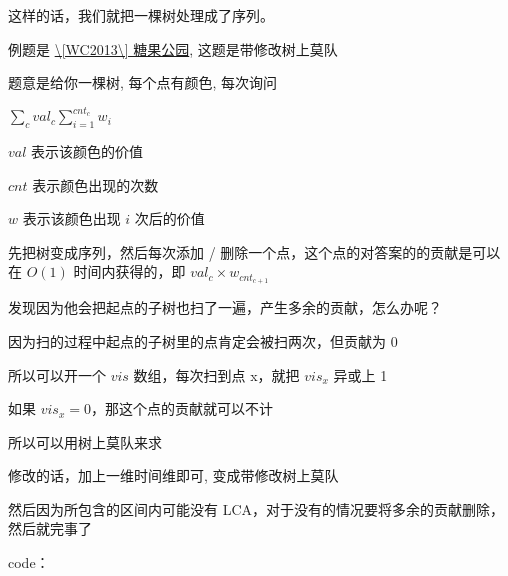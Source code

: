 这样的话，我们就把一棵树处理成了序列。

例题是 \href{https://www.luogu.org/problemnew/show/P4074}{\textbackslash{}[WC2013\textbackslash{}] 糖果公园}, 这题是带修改树上莫队

题意是给你一棵树, 每个点有颜色, 每次询问

$\sum_{c}val_c\sum_{i=1}^{cnt_c}w_i$

$val$ 表示该颜色的价值

$cnt$ 表示颜色出现的次数

$w$ 表示该颜色出现 $i$ 次后的价值

先把树变成序列，然后每次添加 / 删除一个点，这个点的对答案的的贡献是可以在 $O(1)$ 时间内获得的，即 $val_c\times w_{cnt_{c+1}}$

发现因为他会把起点的子树也扫了一遍，产生多余的贡献，怎么办呢？

因为扫的过程中起点的子树里的点肯定会被扫两次，但贡献为 0

所以可以开一个 $vis$ 数组，每次扫到点 x，就把 $vis_x$ 异或上 1

如果 $vis_x=0$，那这个点的贡献就可以不计

所以可以用树上莫队来求

修改的话，加上一维时间维即可, 变成带修改树上莫队

然后因为所包含的区间内可能没有 LCA，对于没有的情况要将多余的贡献删除，然后就完事了

code：

